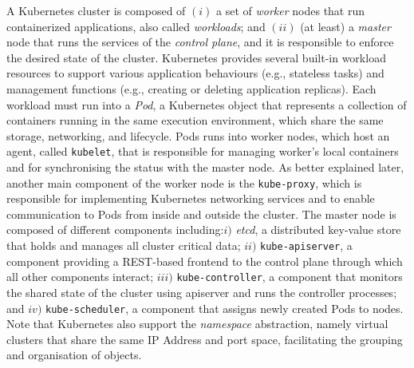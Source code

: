 A Kubernetes cluster is composed of $(i)$ a set of \textit{worker} nodes that run containerized applications, also called \textit{workloads}; and $(ii)$ (at least) a \textit{master} node that runs the services of the \textit{control plane}, and it is responsible to enforce the desired state of the cluster. Kubernetes provides several built-in workload resources to support various application behaviours (e.g., stateless tasks) and management functions (e.g., creating or deleting application replicas). Each workload must run into a \textit{Pod}, a Kubernetes object that represents a collection of containers running in the same execution environment, which share the same storage, networking, and lifecycle. Pods runs into worker nodes, which host an agent, called \texttt{kubelet}, that is responsible for managing worker's local containers and for synchronising the status with the master node. As better explained later, another main component of the worker node is the \texttt{kube-proxy}, which is responsible for implementing Kubernetes networking services and to enable communication to Pods from inside and outside the cluster. The master node is composed of different components including:$i)$ \textit{etcd}, a distributed key-value store that holds and manages all cluster critical data; $ii)$ \texttt{kube-apiserver}, a component providing a REST-based frontend to the control plane through which all other components interact; $iii)$ \texttt{kube-controller}, a component that monitors the shared state of the cluster using apiserver and runs the controller processes; and $iv)$ \texttt{kube-scheduler}, a component that assigns newly created Pods to nodes.  Note that Kubernetes also support the \textit{namespace} abstraction, namely virtual clusters that share the same IP Address and port space, facilitating the grouping and organisation of objects.    

